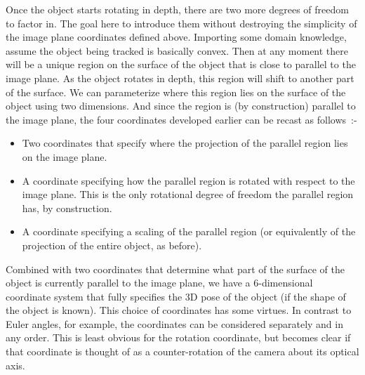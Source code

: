 Once the object starts rotating in depth, there are two more degrees of
freedom to factor in.  The goal here to introduce them without
destroying the simplicity of the image plane coordinates defined
above.  Importing some domain knowledge, assume the object being
tracked is basically convex.  Then at any moment there will be a
unique region on the surface of the object that is close to parallel
to the image plane.  As the object rotates in depth, this region will
shift to another part of the surface.  We can parameterize where this
region lies on the surface of the object using two dimensions.  And
since the region is (by construction) parallel to the image plane, the
four coordinates developed earlier can be recast as follows~:-

\begin{itemize}

\item 
Two coordinates that specify where the projection of the parallel
region lies on the image plane.

\item
A coordinate specifying how the parallel region is rotated with
respect to the image plane.  This is the only rotational degree of
freedom the parallel region has, by construction.

\item 
A coordinate specifying a scaling of the parallel region (or equivalently
of the projection of the entire object, as before).

\end{itemize}

Combined with two coordinates that determine what part of the surface
of the object is currently parallel to the image plane, we have a
6-dimensional coordinate system that fully specifies the 3D pose of
the object (if the shape of the object is known).  This choice of
coordinates has some virtues.  In contrast to Euler angles, for
example, the coordinates can be considered separately and in any
order.  This is least obvious for the rotation coordinate, but becomes
clear if that coordinate is thought of as a counter-rotation of the
camera about its optical axis.

